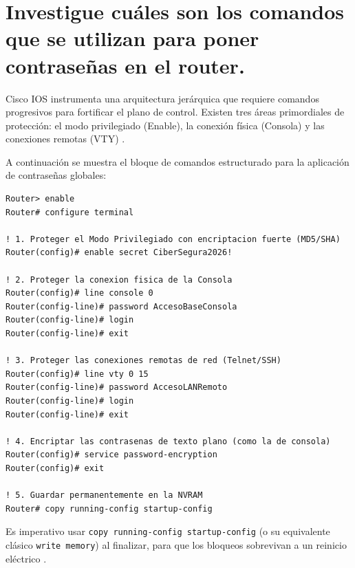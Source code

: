 \documentclass[a4paper,12pt]{article}
\begin{document}
\newpage

\section{Investigue cuáles son los comandos que se utilizan para poner contraseñas en el router.}

Cisco IOS instrumenta una arquitectura jerárquica que requiere comandos progresivos para fortificar el plano de control. Existen tres áreas primordiales de protección: el modo privilegiado (Enable), la conexión física (Consola) y las conexiones remotas (VTY) \cite{cisco_passwords}.

A continuación se muestra el bloque de comandos estructurado para la aplicación de contraseñas globales:

\begin{lstlisting}
Router> enable
Router# configure terminal

! 1. Proteger el Modo Privilegiado con encriptacion fuerte (MD5/SHA)
Router(config)# enable secret CiberSegura2026!

! 2. Proteger la conexion fisica de la Consola
Router(config)# line console 0
Router(config-line)# password AccesoBaseConsola
Router(config-line)# login
Router(config-line)# exit

! 3. Proteger las conexiones remotas de red (Telnet/SSH)
Router(config)# line vty 0 15
Router(config-line)# password AccesoLANRemoto
Router(config-line)# login
Router(config-line)# exit

! 4. Encriptar las contrasenas de texto plano (como la de consola)
Router(config)# service password-encryption
Router(config)# exit

! 5. Guardar permanentemente en la NVRAM
Router# copy running-config startup-config
\end{lstlisting}
Es imperativo usar \texttt{copy running-config startup-config} (o su equivalente clásico \texttt{write memory}) al finalizar, para que los bloqueos sobrevivan a un reinicio eléctrico \cite{netwrix_saverun}.

\newpage
\end{document}
